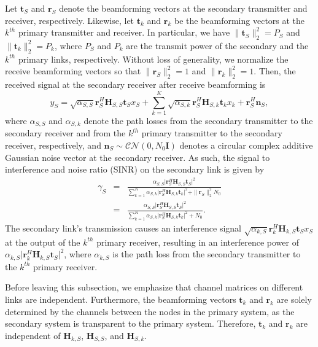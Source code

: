 \documentclass[twocolumn,10pt]{IEEEtran}
\theoremstyle{plain} \newtheorem{theorem}{Theorem}
\theoremstyle{plain} \newtheorem{proposition}{Proposition}
\theoremstyle{plain} \newtheorem{corollary}{Corollary}
\theoremstyle{remark} \newtheorem{remark}{Remark}
\theoremstyle{remark} \newtheorem{lemma}{Lemma}
\theoremstyle{plain} \newtheorem{definition}{Definition}
\theoremstyle{plain} \newtheorem{assumption}{Assumption}
\theoremstyle{plain} \newtheorem{fact}{Fact}
\begin{document}
Let $\mathbf{t}_S$ and $\mathbf{r}_S$ denote the beamforming vectors at the secondary transmitter and receiver, respectively. Likewise, let $\mathbf{t}_k$ and $\mathbf{r}_k$ be the beamforming vectors at the $k^{th}$ primary transmitter and receiver. In particular, we have $\|\mathbf{t}_S\|_2^2=P_S$ and $\|\mathbf{t}_k\|_2^2=P_k$, where $P_S$ and $P_k$ are the transmit power of the secondary and the $k^{th}$ primary links, respectively. Without loss of generality, we normalize the receive beamforming vectors so that $\|\mathbf{r}_S\|_2^2=1$ and $\|\mathbf{r}_k\|_2^2=1$.  Then, the received signal at the secondary receiver after receive beamforming is
$$
y_S=\sqrt{\alpha_{S,S}} \mathbf{r}_S^H\mathbf{H}_{S,S}\mathbf{t}_S x_S +\sum_{k=1}^K \sqrt{\alpha_{S,k}} \mathbf{r}_S^H\mathbf{H}_{S,k}\mathbf{t}_k x_k+\mathbf{r}_S^H \mathbf{n}_S,
$$
where $\alpha_{S,S}$ and $\alpha_{S,k}$ denote the path losses from the secondary transmitter to the secondary receiver and from the $k^{th}$ primary transmitter to the secondary receiver, respectively, and $\mathbf{n}_S\sim\mathcal{CN}(0,N_0 \mathbf{I})$ denotes a circular complex additive Gaussian noise vector at the secondary receiver. As such, the signal to interference and noise ratio (SINR) on the secondary link is given by
\begin{eqnarray} \label{eq:SINR}
   \gamma_S &=& \frac{\alpha_{S,S}\big|\mathbf{r}_S^H\mathbf{H}_{S,S}\mathbf{t}_S\big|^2}{\sum_{k=1}^K\alpha_{S,k} \big|\mathbf{r}_S^H\mathbf{H}_{S,k}\mathbf{t}_k\big|^2 + \|\mathbf{r}_S\|_2^2N_0}\nonumber\\
   &=&\frac{\alpha_{S,S}\big|\mathbf{r}_S^H\mathbf{H}_{S,S}\mathbf{t}_S\big|^2}{\sum_{k=1}^K\alpha_{S,k} \big|\mathbf{r}_S^H\mathbf{H}_{S,k}\mathbf{t}_k\big|^2 + N_0}.
\end{eqnarray}
The secondary link's transmission causes an interference signal $\sqrt{\alpha_{k,S}} \mathbf{r}_k^H \mathbf{H}_{k,S} \mathbf{t}_S x_S$ at the output of the $k^{th}$ primary receiver, resulting in an interference power of $
\alpha_{k,S}\big|\mathbf{r}_k^H \mathbf{H}_{k,S}\mathbf{t}_S\big|^2$,
where $\alpha_{k,S}$ is the path loss from the secondary transmitter to the $k^{th}$ primary receiver.

Before leaving this subsection, we emphasize that channel matrices on different links are independent. Furthermore, the beamforming vectors $\mathbf{t}_k$ and $\mathbf{r}_k$ are solely determined by the channels between the nodes in the primary system, as the secondary system is transparent to the primary system. Therefore, $\mathbf{t}_k$ and $\mathbf{r}_k$ are independent of $\mathbf{H}_{k,S}$, $\mathbf{H}_{S,S}$, and $\mathbf{H}_{S,k}$.
\end{document}
